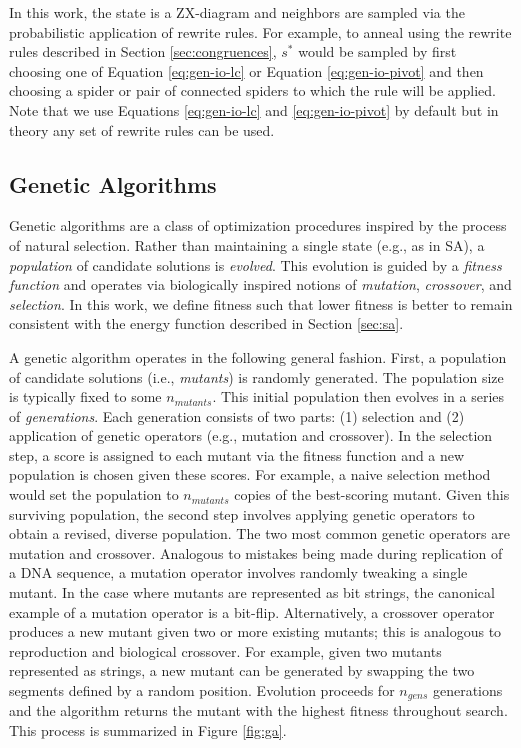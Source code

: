 In this work, the state is a ZX-diagram and neighbors are sampled via the probabilistic application of rewrite rules.
For example, to anneal using the rewrite rules described in Section \ref{sec:congruences}, $s^*$ would be sampled by first choosing one of Equation \ref{eq:gen-io-lc} or Equation \ref{eq:gen-io-pivot} and then choosing a spider or pair of connected spiders to which the rule will be applied.
Note that we use Equations \ref{eq:gen-io-lc} and \ref{eq:gen-io-pivot} by default but in theory any set of rewrite rules can be used.

\subsection{Genetic Algorithms}

Genetic algorithms are a class of optimization procedures inspired by the process of natural selection.
Rather than maintaining a single state (e.g., as in SA), a \emph{population} of candidate solutions is \emph{evolved}.
This evolution is guided by a \emph{fitness function} and operates via biologically inspired notions of \emph{mutation}, \emph{crossover}, and \emph{selection}.
In this work, we define fitness such that lower fitness is better to remain consistent with the energy function described in Section \ref{sec:sa}.

A genetic algorithm operates in the following general fashion.
First, a population of candidate solutions (i.e., \emph{mutants}) is randomly generated.
The population size is typically fixed to some $n_{mutants}$.
This initial population then evolves in a series of \emph{generations}.
Each generation consists of two parts: (1) selection and (2) application of genetic operators (e.g., mutation and crossover).
In the selection step, a score is assigned to each mutant via the fitness function and a new population is chosen given these scores.
For example, a naive selection method would set the population to $n_{mutants}$ copies of the best-scoring mutant.
Given this surviving population, the second step involves applying genetic operators to obtain a revised, diverse population.
The two most common genetic operators are mutation and crossover.
Analogous to mistakes being made during replication of a DNA sequence, a mutation operator involves randomly tweaking a single mutant.
In the case where mutants are represented as bit strings, the canonical example of a mutation operator is a bit-flip.
Alternatively, a crossover operator produces a new mutant given two or more existing mutants;
this is analogous to reproduction and biological crossover.
For example, given two mutants represented as strings, a new mutant can be generated by swapping the two segments defined by a random position.
Evolution proceeds for $n_{gens}$ generations and the algorithm returns the mutant with the highest fitness throughout search.
This process is summarized in Figure \ref{fig:ga}.

